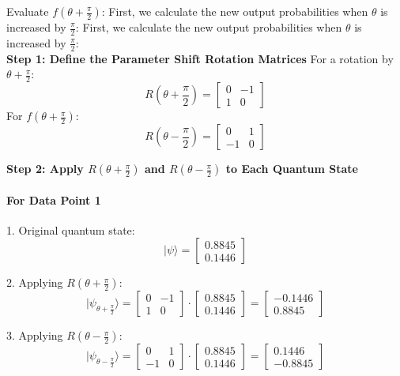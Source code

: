 \documentclass[a4paper]{article}
\begin{document}
\noindent Evaluate \( f\left(\theta + \frac{\pi}{2}\right) \):  First, we calculate the new output probabilities when \( \theta \) is increased by \( \frac{\pi}{2} \):
First, we calculate the new output probabilities when \( \theta \) is increased by \( \frac{\pi}{2} \):\\

\textbf{Step 1: Define the Parameter Shift Rotation Matrices}
For a rotation by \( \theta + \frac{\pi}{2} \):\[R\left(\theta + \frac{\pi}{2}\right) = \begin{bmatrix} 0 & -1 \\ 1 & 0 \end{bmatrix}\]
For \( f\left(\theta + \frac{\pi}{2}\right) \): \[ R\left(\theta - \frac{\pi}{2}\right) = \begin{bmatrix} 0 & 1 \\ -1 & 0 \end{bmatrix} \]

\textbf{Step 2: Apply \( R(\theta + \frac{\pi}{2}) \) and \( R(\theta - \frac{\pi}{2}) \) to Each Quantum State}

\paragraph{For Data Point 1}
1. Original quantum state:
\[| \psi \rangle = \begin{bmatrix} 0.8845 \\ 0.1446 \end{bmatrix}\]

2. Applying \( R(\theta + \frac{\pi}{2}) \):
\[| \psi_{\theta + \frac{\pi}{2}} \rangle = \begin{bmatrix} 0 & -1 \\ 1 & 0 \end{bmatrix} \cdot \begin{bmatrix} 0.8845 \\ 0.1446 \end{bmatrix} = \begin{bmatrix} -0.1446 \\ 0.8845 \end{bmatrix}\]

3. Applying \( R(\theta - \frac{\pi}{2}) \):
\[| \psi_{\theta - \frac{\pi}{2}} \rangle = \begin{bmatrix} 0 & 1 \\ -1 & 0 \end{bmatrix} \cdot \begin{bmatrix} 0.8845 \\ 0.1446 \end{bmatrix} = \begin{bmatrix} 0.1446 \\ -0.8845 \end{bmatrix}\]
\end{document}

